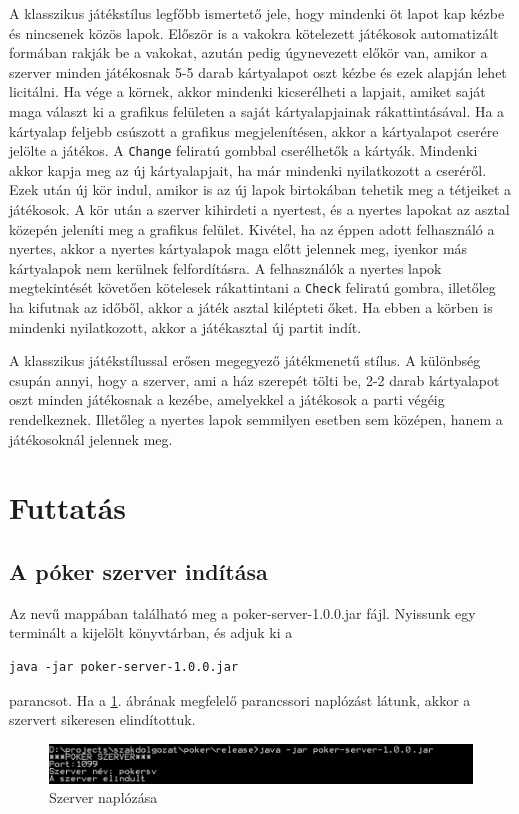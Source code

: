 A klasszikus játékstílus legfőbb ismertető jele, hogy mindenki öt lapot kap kézbe és nincsenek közös lapok. Először is a vakokra kötelezett játékosok automatizált formában rakják be a vakokat, azután pedig úgynevezett előkör van, amikor a szerver minden játékosnak 5-5 darab kártyalapot oszt kézbe és ezek alapján lehet licitálni. Ha vége a körnek, akkor mindenki kicserélheti a lapjait, amiket saját maga választ ki a grafikus felületen a saját kártyalapjainak rákattintásával. Ha a kártyalap feljebb csúszott a grafikus megjelenítésen, akkor a kártyalapot cserére jelölte a játékos. A \texttt{Change} feliratú gombbal cserélhetők a kártyák. Mindenki akkor kapja meg az új kártyalapjait, ha már mindenki nyilatkozott a cseréről. Ezek után új kör indul, amikor is az új lapok birtokában tehetik meg a tétjeiket a játékosok. A kör után a szerver kihirdeti a nyertest, és a nyertes lapokat az asztal közepén jeleníti meg a grafikus felület. Kivétel, ha az éppen adott felhasználó a nyertes, akkor a nyertes kártyalapok maga előtt jelennek meg, iyenkor más kártyalapok nem kerülnek felfordításra. A felhasználók a nyertes lapok megtekintését követően kötelesek rákattintani a \texttt{Check} feliratú gombra, illetőleg ha kifutnak az időből, akkor a játék asztal kilépteti őket. Ha ebben a körben is mindenki nyilatkozott, akkor a játékasztal új partit indít.

A klasszikus játékstílussal erősen megegyező játékmenetű stílus. A különbség csupán annyi, hogy a szerver, ami a ház szerepét tölti be, 2-2 darab kártyalapot oszt minden játékosnak a kezébe, amelyekkel a játékosok a parti végéig rendelkeznek. Illetőleg a nyertes lapok semmilyen esetben sem középen, hanem a játékosoknál jelennek meg.

\section{Futtatás}

\subsection{A póker szerver indítása}
Az  nevű mappában található meg  a poker-server-1.0.0.jar fájl. Nyissunk egy terminált a kijelölt könyvtárban, és adjuk ki a
 \begin{Verbatim}[xleftmargin=.5in]
java -jar poker-server-1.0.0.jar
\end{Verbatim}
parancsot. Ha a \ref{fig:server_started}. ábrának megfelelő parancssori naplózást látunk, akkor a szervert sikeresen elindítottuk.
\begin{figure}[h!]
  \caption{Szerver naplózása}
  \label{fig:server_started}
  \centering
    \includegraphics[width=\linewidth]{user-documentation/images/server_started.jpg}
\end{figure}


